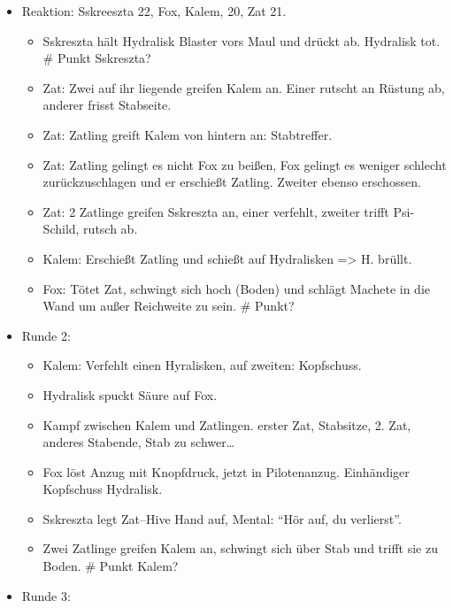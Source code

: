 \documentclass[11pt]{article}
\begin{document}
\begin{itemize}
\item
  Reaktion: Sskreeszta 22, Fox, Kalem, 20, Zat 21.

  \begin{itemize}
  \item
    Sskreszta hält Hydralisk Blaster vors Maul und drückt ab. Hydralisk
    tot. \# Punkt Sskreszta?
  \item
    Zat: Zwei auf ihr liegende greifen Kalem an. Einer rutscht an
    Rüstung ab, anderer frisst Stabseite.
  \item
    Zat: Zatling greift Kalem von hintern an: Stabtreffer.
  \item
    Zat: Zatling gelingt es nicht Fox zu beißen, Fox gelingt es weniger
    schlecht zurückzuschlagen und er erschießt Zatling. Zweiter ebenso
    erschossen.
  \item
    Zat: 2 Zatlinge greifen Sskreszta an, einer verfehlt, zweiter trifft
    Psi-Schild, rutsch ab.
  \item
    Kalem: Erschießt Zatling und schießt auf Hydralisken =\textgreater{}
    H. brüllt.
  \item
    Fox: Tötet Zat, schwingt sich hoch (Boden) und schlägt Machete in
    die Wand um außer Reichweite zu sein. \# Punkt?
  \end{itemize}
\item
  Runde 2:

  \begin{itemize}
  \item
    Kalem: Verfehlt einen Hyralisken, auf zweiten: Kopfschuss.
  \item
    Hydralisk spuckt Säure auf Fox.
  \item
    Kampf zwischen Kalem und Zatlingen. erster Zat, Stabsitze, 2. Zat,
    anderes Stabende, Stab zu schwer\ldots{}
  \item
    Fox löst Anzug mit Knopfdruck, jetzt in Pilotenanzug. Einhändiger
    Kopfschuss Hydralisk.
  \item
    Sskreszta legt Zat--Hive Hand auf, Mental: ``Hör auf, du
    verlierst''.
  \item
    Zwei Zatlinge greifen Kalem an, schwingt sich über Stab und trifft
    sie zu Boden. \# Punkt Kalem?
  \end{itemize}
\item
  Runde 3:


\end{itemize}
\end{document}
